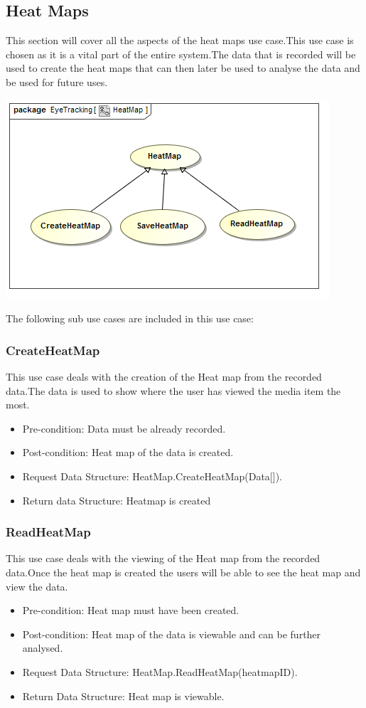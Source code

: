 \subsection{Heat Maps}
This section will cover all the aspects of the heat maps use case.This use case is chosen as it is a vital part of the entire system.The data that is recorded will be used to create the heat maps that can then later be used to analyse the data and be used for future uses.

\includegraphics[scale=0.5]{Diagrams/Use_Case_Diagram__HeatMap.png}

The following sub use cases are included in this use case:
\subsubsection{CreateHeatMap}
This use case deals with the creation of the Heat map from the recorded data.The data is used to show where the user has viewed the media item the most.
\begin{itemize}
\item Pre-condition: Data must be already recorded.
\item Post-condition: Heat map of the data is created.
\item Request Data Structure: HeatMap.CreateHeatMap(Data[]).
\item Return data Structure: Heatmap is created
\end{itemize}
\subsubsection{ReadHeatMap}
This use case deals with the viewing of the Heat map from the recorded data.Once the heat map is created the users will be able to see the heat map and view the data.
\begin{itemize}
\item Pre-condition: Heat map must have been created.
\item Post-condition: Heat map of the data is viewable and can be further analysed.
\item Request Data Structure: HeatMap.ReadHeatMap(heatmapID).
\item Return Data Structure: Heat map is viewable.
\end{itemize}
